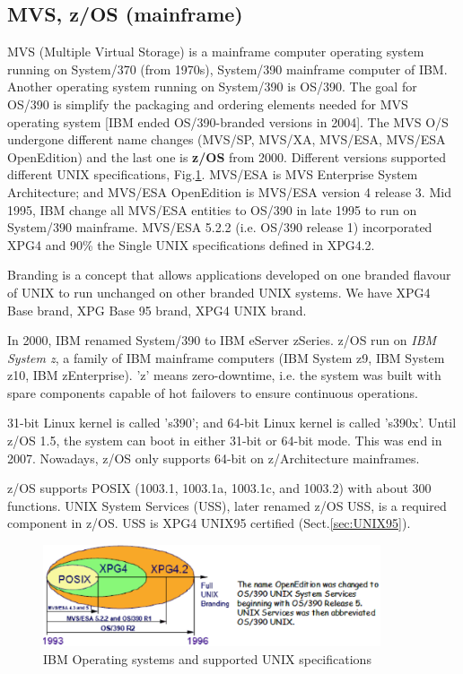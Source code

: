 \subsection{MVS, z/OS (mainframe)}

MVS (Multiple Virtual Storage) is a mainframe computer operating system running
on System/370 (from 1970s), System/390 mainframe computer of IBM. Another
operating system running on System/390 is OS/390. The goal for OS/390 is
simplify the packaging and ordering elements needed for MVS operating system
[IBM ended OS/390-branded versions in 2004].  The MVS O/S undergone different
name changes (MVS/SP, MVS/XA, MVS/ESA, MVS/ESA OpenEdition) and the last one is
{\bf z/OS} from 2000. Different versions supported different UNIX
specifications, Fig.\ref{fig:IBM_operating-systems}. MVS/ESA is MVS Enterprise
System Architecture; and MVS/ESA OpenEdition is MVS/ESA version 4 release 3. Mid
1995, IBM change all MVS/ESA entities to OS/390 in late 1995 to run on
System/390 mainframe. MVS/ESA 5.2.2 (i.e. OS/390 release 1) incorporated XPG4
and 90\% the Single UNIX specifications defined in XPG4.2.

\begin{mdframed}
Branding is a concept that allows applications developed on one branded flavour
of UNIX to run unchanged on other branded UNIX systems. We have XPG4 Base brand,
XPG Base 95 brand, XPG4 UNIX brand.

\end{mdframed}

In 2000, IBM renamed System/390 to IBM eServer zSeries.  z/OS run on {\it IBM
System z}, a family of IBM mainframe computers (IBM System z9, IBM System z10,
IBM zEnterprise). 'z' means zero-downtime, i.e. the system was built with spare
components capable of hot failovers to ensure continuous operations.

31-bit Linux kernel is called 's390'; and 64-bit Linux kernel is called 's390x'.  
Until z/OS 1.5, the system can boot in either 31-bit or 64-bit mode. 
This was end in 2007. Nowadays, z/OS only supports 64-bit on z/Architecture
mainframes.

z/OS supports POSIX (1003.1, 1003.1a, 1003.1c, and 1003.2) with about 300
functions. UNIX System Services (USS), later renamed z/OS USS, is a required
component in z/OS. USS is XPG4 UNIX95 certified (Sect.\ref{sec:UNIX95}). 


\begin{figure}[hbt]
  \centerline{\includegraphics[height=3cm,
    angle=0]{./images/IBM_operating-systems.eps}}
  \caption{IBM Operating systems and supported UNIX specifications}
  \label{fig:IBM_operating-systems}
\end{figure}


